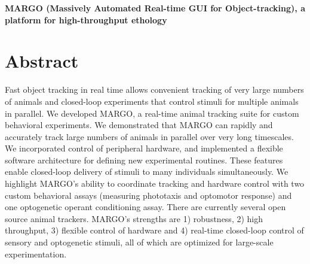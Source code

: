 \documentclass[10pt]{article}
\begin{document}



\begin{center}
	\LARGE\textbf{MARGO (Massively Automated Real-time GUI for Object-tracking), a platform for high-throughput ethology}\\
	\large\textbf{}
\end{center}

\section*{Abstract}

Fast object tracking in real time allows convenient tracking of very large numbers of animals and closed-loop experiments that control stimuli for multiple animals in parallel. We developed MARGO, a real-time animal tracking suite for custom behavioral experiments. We demonstrated that MARGO can rapidly and accurately track large numbers of animals in parallel over very long timescales. We incorporated control of peripheral hardware, and implemented a flexible software architecture for defining new experimental routines. These features enable closed-loop delivery of stimuli to many individuals simultaneously. We highlight MARGO's ability to coordinate tracking and hardware control with two custom behavioral assays (measuring phototaxis and optomotor response) and one optogenetic operant conditioning assay. There are currently several open source animal trackers. MARGO’s strengths are 1) robustness, 2) high throughput, 3) flexible control of hardware and 4) real-time closed-loop control of sensory and optogenetic stimuli, all of which are optimized for large-scale experimentation.
\end{document}
